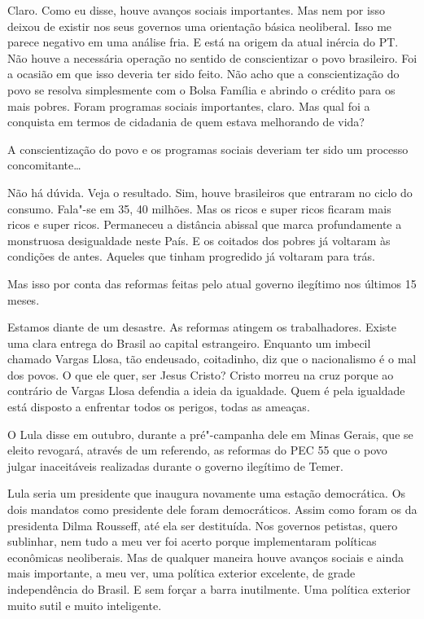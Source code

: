 \falaM Claro. Como eu disse, houve avanços sociais importantes. Mas nem por
isso deixou de existir nos seus governos uma orientação básica
neoliberal. Isso me parece negativo em uma análise fria. E está na
origem da atual inércia do PT. Não houve a necessária operação no
sentido de conscientizar o povo brasileiro. Foi a ocasião em que isso
deveria ter sido feito. Não acho que a conscientização do povo se
resolva simplesmente com o Bolsa Família e abrindo o crédito para os
mais pobres. Foram programas sociais importantes, claro. Mas qual foi a
conquista em termos de cidadania de quem estava melhorando de vida?

\falaG A conscientização do povo e os programas sociais deveriam ter sido um
processo concomitante…

\falaM Não há dúvida. Veja o resultado. Sim, houve brasileiros que entraram
no ciclo do consumo. Fala"-se em 35, 40 milhões. Mas os ricos e super
ricos ficaram mais ricos e super ricos. Permaneceu a distância abissal
que marca profundamente a monstruosa desigualdade neste País. E os
coitados dos pobres já voltaram às condições de antes. Aqueles que
tinham progredido já voltaram para trás.

\falaG Mas isso por conta das reformas feitas pelo atual governo ilegítimo
nos últimos 15 meses.

\falaM Estamos diante de um desastre. As reformas atingem os trabalhadores.
Existe uma clara entrega do Brasil ao capital estrangeiro. Enquanto um
imbecil chamado Vargas Llosa, tão endeusado, coitadinho, diz que o
nacionalismo é o mal dos povos. O que ele quer, ser Jesus Cristo? Cristo
morreu na cruz porque ao contrário de Vargas Llosa defendia a ideia da
igualdade. Quem é pela igualdade está disposto a enfrentar todos os
perigos, todas as ameaças.

\falaG O Lula disse em outubro, durante a pré"-campanha dele em Minas Gerais,
que se eleito revogará, através de um referendo, as reformas do PEC 55
que o povo julgar inaceitáveis realizadas durante o governo ilegítimo de
Temer.

\falaM Lula seria um presidente que inaugura novamente uma estação
democrática. Os dois mandatos como presidente dele foram democráticos.
Assim como foram os da presidenta Dilma Rousseff, até ela ser
destituída. Nos governos petistas, quero sublinhar, nem tudo a meu ver
foi acerto porque implementaram políticas econômicas neoliberais. Mas de
qualquer maneira houve avanços sociais e ainda mais importante, a meu
ver, uma política exterior excelente, de grade independência do Brasil.
E sem forçar a barra inutilmente. Uma política exterior muito sutil e
muito inteligente.

